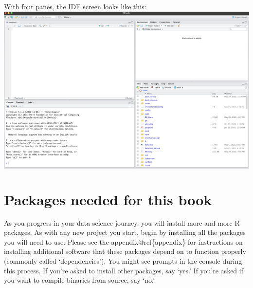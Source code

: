 \documentclass[
  krantz2]{krantz}
\begin{document}
With four panes, the IDE screen looks like this:
\includegraphics{images/4-panes.png}

\hypertarget{pkgs-download}{%
\section{Packages needed for this book}\label{pkgs-download}}

As you progress in your data science journey, you will install more and more R packages. As with any new project you start, begin by installing all the packages you will need to use. Please see the appendix@ref\{appendix\} for instructions on installing additional software that these packages depend on to function properly (commonly called `dependencies'). You might see prompts in the console during this process. If you're asked to install other packages, say `yes.' If you're asked if you want to compile binaries from source, say `no.'
\end{document}
